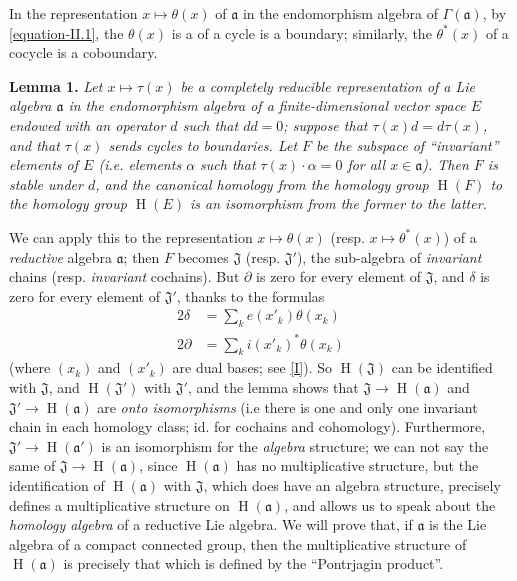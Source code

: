 \documentclass{article}
\newcommand{\fk}{\mathfrak}
\DeclareMathOperator{\HH}{H}
\newcommand{\oldpage}[1]{\marginpar{\footnotesize$\Big\vert$ \textit{p.~#1}}}
\begin{document}
In the representation $x\mapsto\theta(x)$ of $\fk{a}$ in the endomorphism algebra of $\Gamma(\fk{a})$, by \cref{equation-II.1}, the $\theta(x)$ is a of a cycle is a boundary;
similarly, the $\theta^*(x)$ of a cocycle is a coboundary.

\medskip
\textbf{Lemma 1.}
{\itshape
  Let $x\mapsto\tau(x)$ be a completely reducible representation of a Lie algebra $\fk{a}$ in the endomorphism algebra of a finite-dimensional vector space $E$ endowed with an operator $d$ such that $dd=0$;
  suppose that $\tau(x)d=d\tau(x)$, and that $\tau(x)$ sends cycles to boundaries.
  Let $F$ be the subspace of ``invariant'' elements of $E$ (i.e. elements $\alpha$ such that $\tau(x)\cdot\alpha=0$ for all $x\in\fk{a}$).
  Then $F$ is stable under $d$, and the canonical homology from the homology group $\HH(F)$ to the homology group $\HH(E)$ is an \emph{isomorphism} from the former to the latter.
}
\medskip

We can apply this to the representation $x\mapsto\theta(x)$ (resp. $x\mapsto\theta^*(x)$) of a \emph{reductive} algebra $\fk{a}$;
then $F$ becomes $\fk{J}$ (resp. $\fk{J}'$), the sub-algebra of \emph{invariant} chains (resp. \emph{invariant} cochains).
But $\partial$ is zero for every element of $\fk{J}$, and $\delta$ is zero for every element of $\fk{J}'$, thanks to the formulas
\[
  \begin{aligned}
    2\delta
    &= \sum_k e(x'_k)\theta(x_k)
  \\2\partial
    &= \sum_k i(x'_k)^*\theta(x_k)
  \end{aligned}
\]
(where $(x_k)$ and $(x'_k)$ are dual bases; see \cref{I}).
So $\HH(\fk{J})$ can be identified with $\fk{J}$,
and
\oldpage{48}
$\HH(\fk{J}')$ with $\fk{J}'$, and the lemma shows that $\fk{J}\to\HH(\fk{a})$ and $\fk{J}'\to\HH(\fk{a})$ are \emph{onto isomorphisms} (i.e there is one and only one invariant chain in each homology class; id. for cochains and cohomology).
Furthermore, $\fk{J}'\to\HH(\fk{a}')$ is an isomorphism for the \emph{algebra} structure;
we can not say the same of $\fk{J}\to\HH(\fk{a})$, since $\HH(\fk{a})$ has no multiplicative structure, but the identification of $\HH(\fk{a})$ with $\fk{J}$, which does have an algebra structure, precisely defines a multiplicative structure on $\HH(\fk{a})$, and allows us to speak about the \emph{homology algebra} of a reductive Lie algebra.
We will prove that, if $\fk{a}$ is the Lie algebra of a compact connected group, then the multiplicative structure of $\HH(\fk{a})$ is precisely that which is defined by the ``Pontrjagin product''.
\end{document}
